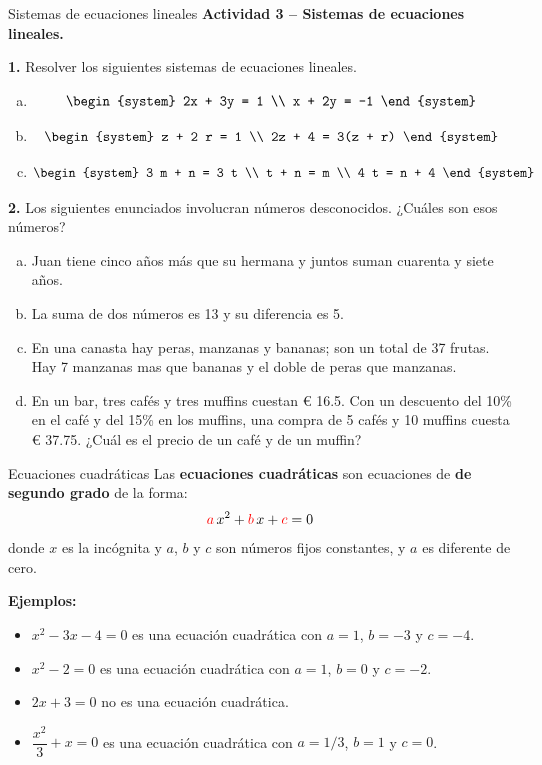 \documentclass[9pt, aspectratio=169]{beamer}
\begin{document}
\begin{frame}{Sistemas de ecuaciones lineales}
\textbf{Actividad 3 -- Sistemas de ecuaciones lineales.}

\textbf{1.} Resolver los siguientes sistemas de ecuaciones lineales.
\begin{multicols}{3}
    \begin{enumerate}[a)]
        \item \[ \begin{system} 2x + 3y = 1 \\ x + 2y = -1 \end{system} \]
        \item \[ \begin{system} z + 2 r = 1 \\ 2z + 4 = 3(z + r) \end{system} \]
        \item \[ \begin{system} 3 m + n = 3 t \\ t + n = m \\ 4 t = n + 4 \end{system} \]
    \end{enumerate}
\end{multicols}

\textbf{2.} Los siguientes enunciados involucran números desconocidos. ¿Cuáles son esos números?
\begin{enumerate}[a)]
    \item Juan tiene cinco años más que su hermana y juntos suman cuarenta y siete años.
    \item La suma de dos números es 13 y su diferencia es 5.
    \item En una canasta hay peras, manzanas y bananas; son un total de 37 frutas. Hay 7 manzanas mas que bananas y el doble de peras que manzanas.
    \item  En un bar, tres cafés y tres muffins cuestan € 16.5. Con un descuento del 10\% en el café y del 15\% en los muffins, una compra de 5 cafés y 10 muffins cuesta € 37.75. ¿Cuál es el precio de un café y de un muffin?
\end{enumerate}
\end{frame}

\begin{frame}{Ecuaciones cuadráticas}
    Las \textbf{ecuaciones cuadráticas} son ecuaciones de \textbf{de segundo grado} de la forma:
    \[ {\color{red}a} \, x^2 + {\color{red}b} \, x + {\color{red}c} = 0 \]
    donde $x$ es la incógnita y $a$, $b$ y $c$ son números fijos constantes, y $a$ es diferente de cero.
\bigskip

\textbf{Ejemplos:}
\begin{itemize}
    \item $x^2-3x-4=0$ es una ecuación cuadrática con $a = 1$, $b = -3$ y $c = -4$.
    \item $x^2 - 2 = 0$ es una ecuación cuadrática con $a = 1$, $b = 0$ y $c = -2$.
    \item $2x+3 = 0$ no es una ecuación cuadrática.
    \item $\dfrac{x^2}{3} + x = 0$ es una ecuación cuadrática con $a = 1/3$, $b = 1$ y $c = 0$.
\end{itemize}
\end{frame}
\end{document}
